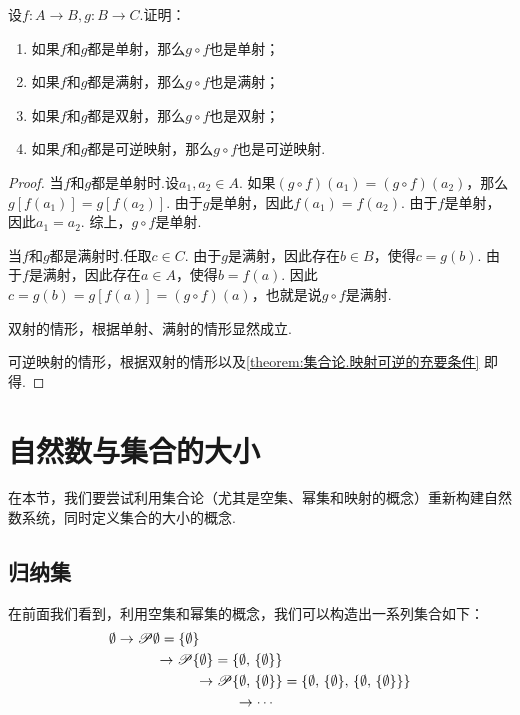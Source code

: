 \begin{example}
设\(f\colon A \to B, g\colon B \to C\).证明：\begin{enumerate}
\item 如果\(f\)和\(g\)都是单射，那么\(g \circ f\)也是单射；
\item 如果\(f\)和\(g\)都是满射，那么\(g \circ f\)也是满射；
\item 如果\(f\)和\(g\)都是双射，那么\(g \circ f\)也是双射；
\item 如果\(f\)和\(g\)都是可逆映射，那么\(g \circ f\)也是可逆映射.
\end{enumerate}
\begin{proof}
当\(f\)和\(g\)都是单射时.设\(a_1,a_2 \in A\).
如果\((g \circ f)(a_1) = (g \circ f)(a_2)\)，那么\(g[f(a_1)] = g[f(a_2)]\).
由于\(g\)是单射，因此\(f(a_1) = f(a_2)\).
由于\(f\)是单射，因此\(a_1 = a_2\).
综上，\(g \circ f\)是单射.

当\(f\)和\(g\)都是满射时.任取\(c \in C\).
由于\(g\)是满射，因此存在\(b \in B\)，使得\(c = g(b)\).
由于\(f\)是满射，因此存在\(a \in A\)，使得\(b = f(a)\).
因此\(c = g(b) = g[f(a)] = (g \circ f)(a)\)，也就是说\(g \circ f\)是满射.

双射的情形，根据单射、满射的情形显然成立.

可逆映射的情形，根据双射的情形以及\cref{theorem:集合论.映射可逆的充要条件} 即得.
\end{proof}
\end{example}

\section{自然数与集合的大小}
在本节，我们要尝试利用集合论（尤其是空集、幂集和映射的概念）重新构建自然数系统，同时定义集合的大小的概念.

\subsection{归纳集}
在前面我们看到，利用空集和幂集的概念，我们可以构造出一系列集合如下：
\[\begin{aligned}
\emptyset
&\to
\Powerset\emptyset = \NaturalSet{1} \\
&\hspace{1cm}\to
\Powerset\NaturalSet{1} = \NaturalSet{2} \\
&\hspace{2cm}\to
\Powerset\NaturalSet{2} = \NaturalSet{3} \\
&\hspace{3cm}\to
\dotsb
\end{aligned}\]

